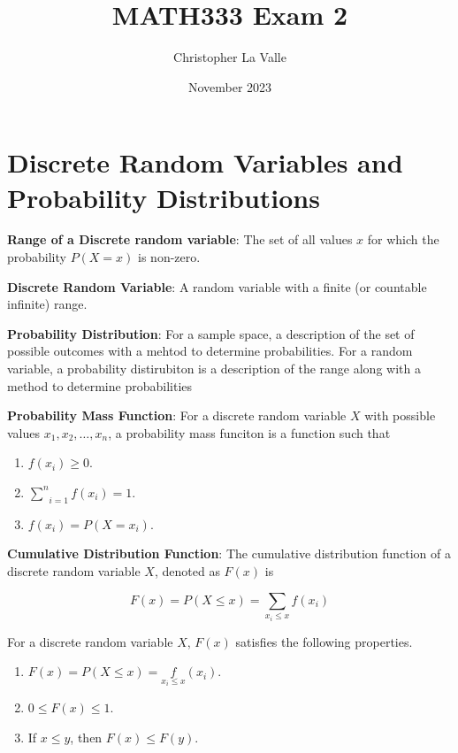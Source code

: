 \documentclass{article}
\title{MATH333 Exam 2}
\author{Christopher La Valle}
\date{November 2023}
\begin{document}
\maketitle

\tableofcontents

\section{Discrete Random Variables and Probability Distributions}

\noindent\textbf{\color{blue}Range of a Discrete random variable}: The set of all values $x$ for which the probability $P(X=x)$ is non-zero.

\noindent\textbf{\color{blue}Discrete Random Variable}: A random variable with a finite (or countable infinite) range.

\noindent\textbf{\color{blue}Probability Distribution}: For a sample space, a description of the set of possible outcomes with a mehtod to determine probabilities. For a random variable, a probability distirubiton is a description of the range along with a method to determine probabilities

\noindent\textbf{\color{blue}Probability Mass Function}: For a discrete random variable $X$ with possible values $x_1,x_2,\ldots,x_n$, a probability mass funciton is a function such that

\begin{enumerate}
    \item $f(x_i)\ge0$.
    \item $\underset{i=1}{\overset{n}{\sum}}f(x_i)=1$.
    \item $f(x_i)=P(X=x_i)$.
\end{enumerate}

\noindent\textbf{\color{blue}Cumulative Distribution Function}: The cumulative distribution function of a discrete random variable $X$, denoted as $F(x)$ is

\[F(x)=P(X\le x)=\underset{x_i\le x}{\sum}f(x_i)\]

For a discrete random variable $X$, $F(x)$ satisfies the following properties.

\begin{enumerate}
    \item $F(x)=P(X\le x)=\underset{x_i\le x}f(x_i)$.
    \item $0\le F(x)\le1$.
    \item If $x\le y$, then $F(x)\le F(y)$.
\end{enumerate}
\end{document}
